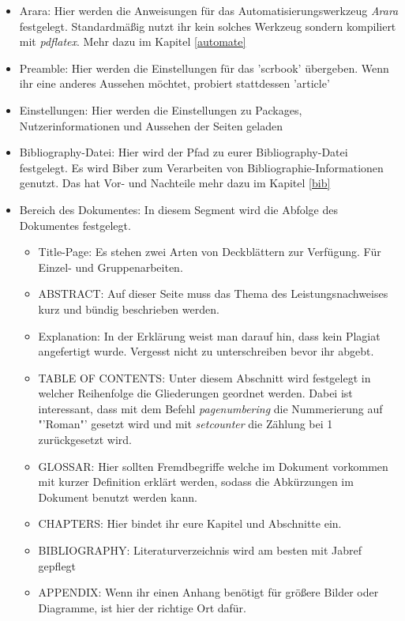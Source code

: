 \begin{itemize}
	\item Arara: Hier werden die Anweisungen für das Automatisierungswerkzeug \emph{Arara} festgelegt. Standardmäßig nutzt ihr kein solches Werkzeug sondern kompiliert mit \emph{pdflatex}. Mehr dazu im Kapitel \ref{automate}
	\item Preamble: Hier werden die Einstellungen für das 'scrbook' übergeben. Wenn ihr eine anderes Aussehen möchtet, probiert stattdessen 'article'
	\item Einstellungen: Hier werden die Einstellungen zu Packages, Nutzerinformationen und Aussehen der Seiten geladen
	\item Bibliography-Datei: Hier wird der Pfad zu eurer Bibliography-Datei festgelegt. Es wird Biber zum Verarbeiten von Bibliographie-Informationen genutzt. Das hat Vor- und Nachteile mehr dazu im Kapitel \ref{bib} 
	\item Bereich des Dokumentes: In diesem Segment wird die Abfolge des Dokumentes festgelegt. 
	\begin{itemize}
		\item Title-Page: Es stehen zwei Arten von Deckblättern zur Verfügung. Für Einzel- und Gruppenarbeiten.
		\item ABSTRACT: Auf dieser Seite muss das Thema des Leistungsnachweises kurz und bündig beschrieben werden.
		\item Explanation: In der Erklärung weist man darauf hin, dass kein Plagiat angefertigt wurde. Vergesst nicht zu unterschreiben bevor ihr abgebt.
		\item TABLE OF CONTENTS: Unter diesem Abschnitt wird festgelegt in welcher Reihenfolge die Gliederungen geordnet werden. Dabei ist interessant, dass mit dem Befehl \emph{pagenumbering} die Nummerierung auf "'Roman"' gesetzt wird und mit \emph{setcounter} die Zählung bei 1 zurückgesetzt wird.
		\item GLOSSAR: Hier sollten Fremdbegriffe welche im Dokument vorkommen mit kurzer Definition erklärt werden, sodass die Abkürzungen im Dokument benutzt werden kann.
		\item CHAPTERS: Hier bindet ihr eure Kapitel und Abschnitte ein.
		\item BIBLIOGRAPHY: Literaturverzeichnis wird am besten mit Jabref gepflegt
		\item APPENDIX: Wenn ihr einen Anhang benötigt für größere Bilder oder Diagramme, ist hier der richtige Ort dafür.
	\end{itemize}
\end{itemize}



